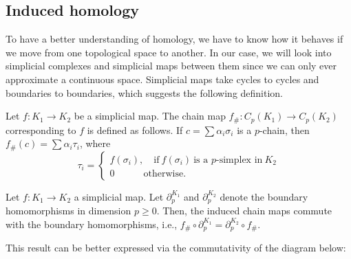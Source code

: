 \subsection{Induced homology}
To have a better understanding of homology, we have to know how it behaves if we move from one topological space to another. In our case, we will look into simplicial complexes and simplicial maps between them since we can only ever approximate a continuous space. Simplicial maps take cycles to cycles and boundaries to boundaries, which suggests the following definition.

\begin{definition}
  Let $f:K_{1} \to K_{2}$ be a simplicial map. The chain map $f_{\#}: C_{p}(K_{1}) \to C_{p}(K_{2})$ corresponding to $f$ is defined as follows. If $c = \sum \alpha_{i}\sigma_{i}$ is a $p$-chain, then $f_{\#}(c) = \sum \alpha_{i} \tau_{i}$, where
  \begin{equation*}
    \tau_{i} =
    \begin{cases}
      f(\sigma_{i}), \quad \text{if} \: f(\sigma_{i}) \: \text{is a $p$-simplex in} \: K_{2} \\
      0 \qquad \quad \text{otherwise}.
    \end{cases}
  \end{equation*}
\end{definition}

\begin{lemma}
  Let $f: K_{1} \to K_{2}$ a simplicial map. Let $\partial_{p}^{K_{1}}$ and $\partial_{p}^{K_{2}}$ denote the boundary homomorphisms in dimension $p \geq 0$. Then, the induced chain maps commute with the boundary homomorphisms, i.e., $f_{\#} \circ \partial_{p}^{K_{1}} = \partial_{p}^{K_{2}} \circ f_{\#}$.
\end{lemma}

This result can be better expressed via the commutativity of the diagram below:

\begin{figure}[h]
  \centering
\end{figure}

